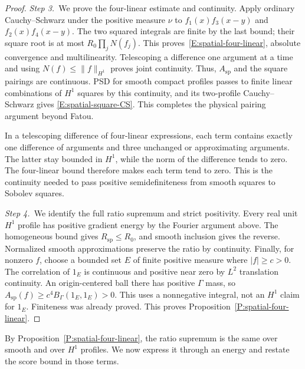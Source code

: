 \begin{proof}
  \medskip
  \noindent\textit{Step 3.~}We prove the four-linear estimate and continuity.
  Apply ordinary Cauchy--Schwarz under the positive measure $\nu$ to
  $f_1(x)f_3(x-y)$ and $f_2(x)f_4(x-y)$. The two squared integrals are finite by
  the last bound; their square root is at most $R_0\prod_jN(f_j)$. This
  proves~\eqref{E:spatial-four-linear}, absolute convergence and multilinearity.
  Telescoping a difference one argument at a time and using $N(f) \le
  \|f\|_{H^1}$ proves joint continuity. Thus, $A_{\mathrm{sp}}$ and the square
  pairings are continuous. PSD for smooth compact profiles passes to finite
  linear combinations of $H^1$ squares by this continuity, and its two-profile
  Cauchy--Schwarz gives \eqref{E:spatial-square-CS}. This completes the physical
  pairing argument beyond Fatou.

  In a telescoping difference of four-linear expressions, each term contains
  exactly one difference of arguments and three unchanged or approximating
  arguments. The latter stay bounded in $H^1$, while the norm of the
  difference tends to zero. The four-linear bound therefore makes each term
  tend to zero. This is the continuity needed to pass positive
  semidefiniteness from smooth squares to Sobolev squares.

  \medskip
  \noindent\textit{Step 4.~}We identify the full ratio supremum and strict
  positivity.
  Every real unit $H^1$ profile has positive gradient energy by the Fourier
  argument above. The homogeneous bound gives $R_{\mathrm{sp}} \le R_0$, and
  smooth inclusion gives the reverse. Normalized smooth approximations preserve
  the ratio by continuity. Finally, for nonzero $f$, choose a bounded set $E$ of
  finite positive measure where $|f| \ge c > 0$. The correlation of $1_E$ is
  continuous and positive near zero by $L^2$ translation continuity. An
  origin-centered ball there has positive $\Gamma$ mass, so $A_{\mathrm{sp}}(f)
  \ge c^4B_\Gamma(1_E,1_E) > 0$. This uses a nonnegative integral, not an $H^1$
  claim for $1_E$. Finiteness was already proved. This proves
  Proposition~\ref{P:spatial-four-linear}.
\end{proof}

By Proposition~\ref{P:spatial-four-linear}, the ratio supremum is the same
over smooth and over $H^1$ profiles. We now express it through an energy and
restate the score bound in those terms.

